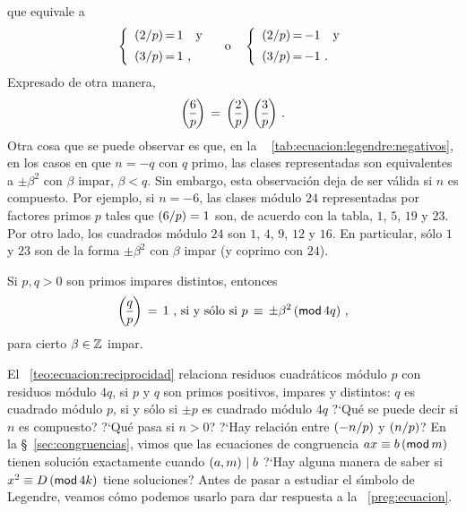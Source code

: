 %
que equivale a
\begin{displaymath}
	\left\{
		\begin{array}{r@{\,=\,}l}
			\tlegendre 2{p} & 1 \quad\text{y} \\[5pt]
			\tlegendre 3{p} & 1 \text{ ,}
		\end{array}
	\right.
	\quad\text{o}\quad
	\left\{
		\begin{array}{r@{\,=\,}l}
			\tlegendre 2{p} & -1 \quad\text{y} \\[5pt]
			\tlegendre 3{p} & -1 \text{ .}
		\end{array}
	\right.
\end{displaymath}
%
Expresado de otra manera,
\begin{displaymath}
	\legendre 6{p}\,=\,\legendre 2{p}\,\legendre 3{p}
	\text{ .}
\end{displaymath}
%
Otra cosa que se puede observar es que, en la \tablename~%
\ref{tab:ecuacion:legendre:negativos}, en los casos en que $n=-q$ con
$q$ primo, las clases representadas son equivalentes a $\pm\beta^2$ con
$\beta$ impar, $\beta<q$. Sin embargo, esta observaci\'on deja de ser
v\'alida si $n$ es compuesto. Por ejemplo, si $n=-6$, las clases m\'odulo
$24$ representadas por factores primos $p$ tales que $\tlegendre 6{p}=1$
son, de acuerdo con la tabla, $1$, $5$, $19$ y $23$. Por otro lado, los
cuadrados m\'odulo $24$ son $1$, $4$, $9$, $12$ y $16$.
En particular, s\'olo $1$ y $23$ son de la forma $\pm\beta^2$ con
$\beta$ impar (y coprimo con $24$).

\begin{teoEcuacion}\label{teo:ecuacion:reciprocidad}
	Si $p,q>0$ son primos impares distintos, entonces
	\begin{displaymath}
		\legendre q{p}\,=\,1
		\text{ , si y s\'olo si }
		p\,\equiv\,\pm\beta^2\tmodulo[4q]
		\text{ ,}
	\end{displaymath}
	para cierto $\beta\in\Enteros$ impar.
\end{teoEcuacion}

El \teoname~\ref{teo:ecuacion:reciprocidad} relaciona residuos cuadr\'aticos
m\'odulo $p$ con residuos m\'odulo $4q$, si $p$ y $q$ son primos positivos,
impares y distintos: $q$ es cuadrado m\'odulo $p$, si y s\'olo si $\pm p$ es
cuadrado m\'odulo $4q$
?`Qu\'e se puede decir si $n$ es compuesto? ?`Qu\'e pasa si $n>0$?
?`Hay relaci\'on entre $\tlegendre{-n} p$ y $\tlegendre n{p}$?
En la \S~\ref{sec:congruencias}, vimos que las ecuaciones de congruencia
$ax\equiv b\tmodulo[m]$ tienen soluci\'on exactamente cuando $\mcd{a,m}\mid b$
?`Hay alguna manera de saber si $x^2\equiv D\tmodulo[4k]$ tiene soluciones?
%
Antes de pasar a estudiar el s\'{\i}mbolo de Legendre, veamos c\'omo podemos
usarlo para dar respuesta a la \pregname~\ref{preg:ecuacion}.

